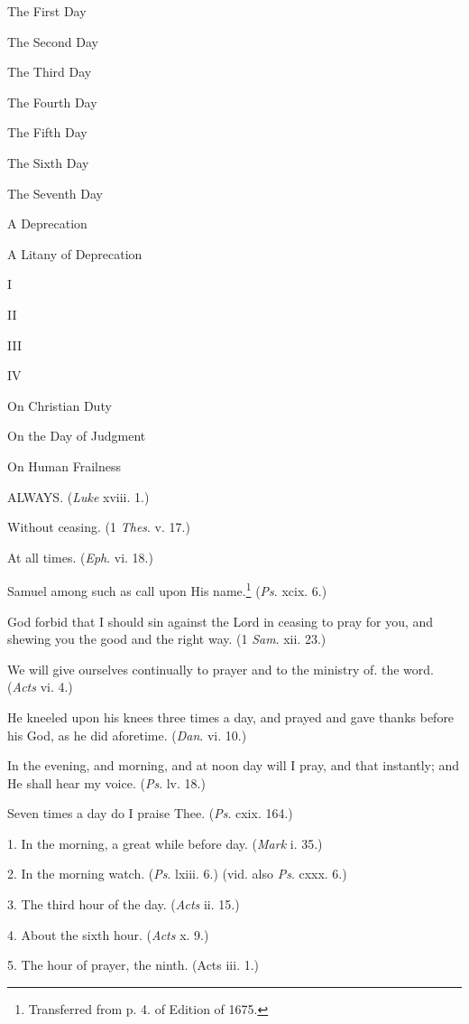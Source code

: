 The First Day

The Second Day

The Third Day

The Fourth Day

The Fifth Day

The Sixth Day

The Seventh Day

A Deprecation

A Litany of Deprecation

I

II

III

IV

On Christian Duty

On the Day of Judgment

On Human Frailness



ALWAYS. (\emph{Luke} xviii. 1.)

Without ceasing. (1 \emph{Thes}. v. 17.)

At all times. (\emph{Eph}. vi. 18.)

Samuel among such as call upon His name.\footnote{Transferred from p. 4. of Edition of 1675.} (\emph{Ps}. xcix. 6.)

God forbid that I should sin against the Lord in ceasing to pray for you, and shewing you the good and the right way. (1 \emph{Sam}. xii. 23.)

We will give ourselves continually to prayer and to the ministry of. the word. (\emph{Acts} vi. 4.)

He kneeled upon his knees three times a day, and prayed and gave thanks before his God, as he did aforetime. (\emph{Dan}. vi. 10.)

In the evening, and morning, and at noon day will I pray, and that instantly; and He shall hear my voice. (\emph{Ps}. lv. 18.)

Seven times a day do I praise Thee. (\emph{Ps}. cxix. 164.)

1. In the morning, a great while before day. (\emph{Mark} i. 35.)

2. In the morning watch. (\emph{Ps}. lxiii. 6.) (vid. also \emph{Ps}. cxxx. 6.)

3. The third hour of the day. (\emph{Acts} ii. 15.)

4. About the sixth hour. (\emph{Acts} x. 9.)

5. The hour of prayer, the ninth. (Acts iii. 1.)

